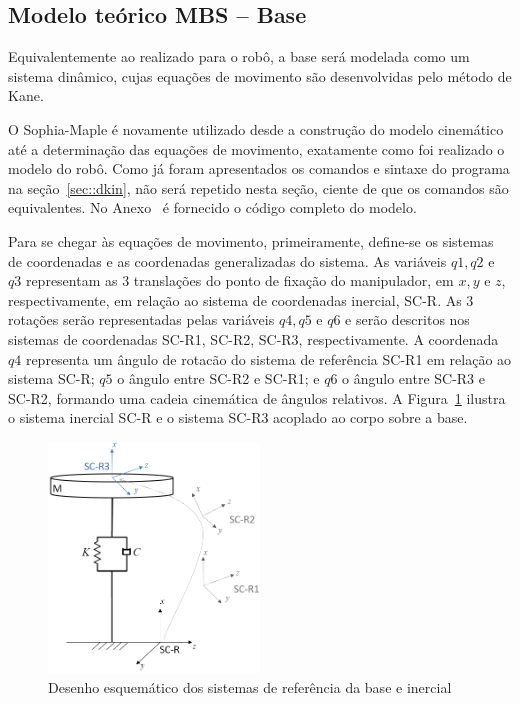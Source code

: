 \subsection{Modelo teórico MBS -- Base}

Equivalentemente ao realizado para o robô, a base será modelada como um
sistema dinâmico, cujas equações de movimento são desenvolvidas pelo método de
Kane.

O Sophia-Maple é novamente utilizado desde a construção do modelo cinemático até
a determinação das equações de movimento, exatamente como foi realizado o modelo
do robô. Como já foram apresentados os comandos e sintaxe do programa na
seção~\ref{sec::dkin}, não será repetido nesta seção, ciente de que os comandos
são equivalentes. No Anexo~ é fornecido o código
completo do modelo.

Para se chegar às equações de movimento, primeiramente, define-se os sistemas de
coordenadas e as coordenadas generalizadas do sistema.
As variáveis $q1, q2$ e $q3$ representam as 3 translações do ponto de fixação do
manipulador, em $x,y$ e $z$, respectivamente, em relação ao sistema de
coordenadas inercial, SC-R. As 3 rotações serão representadas pelas variáveis
$q4, q5$ e $q6$ e serão descritos nos sistemas de coordenadas SC-R1, SC-R2,
SC-R3, respectivamente.
A coordenada $q4$ representa um ângulo de rotacão do sistema de referência SC-R1
em relação ao sistema SC-R; $q5$ o ângulo entre SC-R2 e SC-R1; e $q6$ o ângulo
entre SC-R3 e SC-R2, formando uma cadeia cinemática de ângulos relativos. A
Figura~\ref{fig::schem_scbase} ilustra o sistema inercial SC-R e o sistema SC-R3
acoplado ao corpo sobre a base.

\begin{figure}[h]
	\centering 
 	\includegraphics[width=0.5\textwidth]{figs/schem_scbase}
 	\caption{Desenho esquemático dos sistemas de referência da base e inercial}
 	\label{fig::schem_scbase}
\end{figure}

